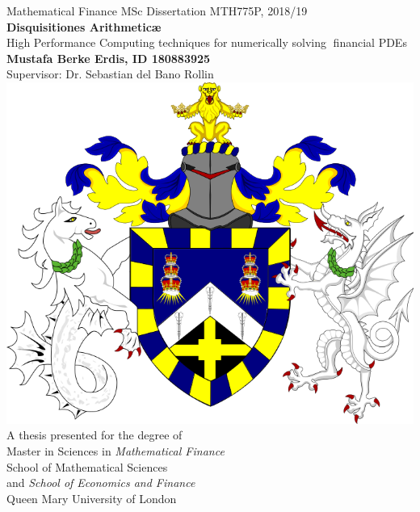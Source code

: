 \documentclass[12pt, oneside]{book}
\theoremstyle{plain}
\theoremstyle{definition}
\begin{document}
\begin{titlepage}
\begin{center}
        \vspace{-2cm}
Mathematical Finance MSc Dissertation MTH775P, 2018/19 
		\\
        \Huge
        \textbf{Disquisitiones Arithmetic\ae}
        \\        
        \vspace{0.4cm}
        \LARGE
        High Performance Computing techniques for numerically solving financial PDEs
        \\        
        \vspace{0.4cm}        
        \textbf{Mustafa Berke Erdis, ID 180883925}%
        \\
        \large Supervisor: Dr. Sebastian del Bano Rollin
        \\
        \vspace{0.9cm}
        \includegraphics[scale=0.3]{QMCrest.png}
        \\
        \vspace{0.9cm}        
        \LARGE 
        A thesis presented for the degree of\\
        Master in Sciences in \emph{Mathematical Finance}\\
        \vspace{0.7cm}        
        \Large
        School of Mathematical Sciences\\ 
        and \emph{School of Economics and Finance}\\
        Queen Mary University of London \\
    \end{center}
\end{titlepage}
\end{document}
